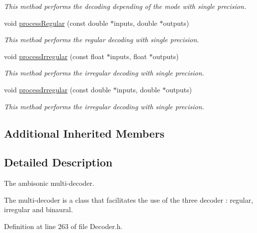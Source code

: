 \begin{DoxyCompactItemize}
\begin{DoxyCompactList}\small\item\em This method performs the decoding depending of the mode with single precision. \end{DoxyCompactList}\item 
void \hyperlink{class_hoa2_d_1_1_decoder_multi_a594583b4853dcabf5f655412faad0fe7}{process\-Regular} (const double $\ast$inputs, double $\ast$outputs)
\begin{DoxyCompactList}\small\item\em This method performs the regular decoding with single precision. \end{DoxyCompactList}\item 
void \hyperlink{class_hoa2_d_1_1_decoder_multi_ae7b3be8b1b39a2242a4a270d5278a4f6}{process\-Irregular} (const float $\ast$inputs, float $\ast$outputs)
\begin{DoxyCompactList}\small\item\em This method performs the irregular decoding with single precision. \end{DoxyCompactList}\item 
void \hyperlink{class_hoa2_d_1_1_decoder_multi_a11493b383a19d621202acebb17568000}{process\-Irregular} (const double $\ast$inputs, double $\ast$outputs)
\begin{DoxyCompactList}\small\item\em This method performs the irregular decoding with single precision. \end{DoxyCompactList}\end{DoxyCompactItemize}
\subsection*{Additional Inherited Members}


\subsection{Detailed Description}
The ambisonic multi-\/decoder. 

The multi-\/decoder is a class that facilitates the use of the three decoder \-: regular, irregular and binaural. 

Definition at line 263 of file Decoder.\-h.



